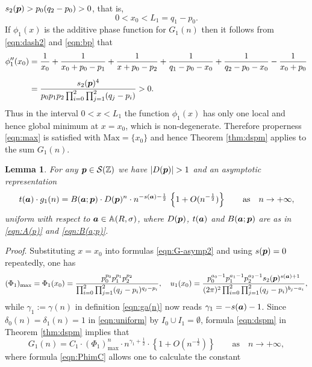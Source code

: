 \documentclass[a4paper,12pt]{article}
\theoremstyle{plain}
\newtheorem{lemma}[theorem]{Lemma}
\def\A{\mathbb{A}}
\def\Z{\mathbb{Z}}
\def\cS{\mathcal{S}}
\def\ba{\mbox{\boldmath $a$}}
\def\sba{\mbox{\boldmath ${\scriptstyle a}$}}
\def\bp{\mbox{\boldmath $p$}}
\def\Mm{\mathrm{M{\scriptstyle ax}}}
\begin{document}
$s_2(\bp) > p_0(q_2-p_0) > 0$, that is,  
\[ 
0 < x_0 < L_1 = q_1 - p_0. 
\]
If $\phi_1(x)$ is the additive phase function for $G_1(n)$ then 
it follows from \eqref{eqn:dash2} and \eqref{eqn:bp} that     
\begin{align*}
\phi_1''(x_0) &= 
\frac{1}{x_0} + \frac{1}{x_0+p_0-p_1} + \frac{1}{x+p_0-p_2} + 
\frac{1}{q_1-p_0-x_0} +  \frac{1}{q_2-p_0-x_0} - \frac{1}{x_0+p_0} \\[2mm]
&= \frac{s_2(\bp)^4}{p_0 p_1 p_2 \prod_{i=0}^2 \prod_{j=1}^2 (q_j-p_i)} > 0. 
\end{align*}
Thus in the interval $0 < x < L_1$ the function $\phi_1(x)$ has only one 
local and hence global minimum at $x = x_0$, which is non-degenerate.  
Therefore properness \eqref{eqn:max} is satisfied with $\Mm = \{x_0 \}$ 
and hence Theorem \ref{thm:dspm} applies to the sum $G_1(n)$. 
\begin{lemma} \label{lem:1st} 
For any $\bp \in \cS(\Z)$ we have $|D(\bp)| > 1$ and an 
asymptotic representation 
\[
t(\ba) \cdot g_1(n) = B(\ba; \bp)   
\cdot D(\bp)^{n} \cdot n^{-s(\sba) -\frac{1}{2} } 
\, \left\{ 1+ O(n^{-\frac{1}{2} }) \right\} \qquad \mbox{as} \quad 
n \to +\infty,     
\]
uniform with respect to $\ba \in \A(R, \sigma)$, where $D(\bp)$, $t(\ba)$ 
and $B(\ba; \bp)$ are as in \eqref{eqn:A(p)} and \eqref{eqn:B(a;p)}.    
\end{lemma}
{\it Proof}.   
Substituting $x = x_0$ into formulas \eqref{eqn:G-asymp2} and 
using $s(\bp) = 0$ repeatedly, one has  
\[
(\Phi_1)_{\mathrm{max}} = \Phi_1(x_0) 
= \dfrac{p_0^{p_0} p_1^{p_1} p_2^{p_2}}{\prod_{i=0}^2 \prod_{j=1}^2 
(q_j - p_i)^{q_j - p_i}},  \quad 
u_1(x_0) 
= \dfrac{p_0^{a_0-1} p_1^{a_1-1} p_2^{a_2-1} 
s_2(\bp)^{s(\sba) + 1}}{(2 \pi)^2 \prod_{i=0}^2 \prod_{j=1}^2 (q_j-p_i)^{b_j-a_i}}, 
\]
while $\gamma_1 := \gamma(n)$ in definition \eqref{eqn:ga(n)} now reads 
$\gamma_1 = - s(\ba) - 1$.  
Since $\delta_0(n) = \delta_1(n) = 1$ in \eqref{eqn:uniform} by 
$I_0 \cup I_1 = \emptyset$, formula \eqref{eqn:dspm} in 
Theorem \ref{thm:dspm} implies that  
\[
G_1(n) = C_1 \cdot (\Phi_1)_{\mathrm{max}}^n \cdot 
n^{\gamma_1 + \frac{1}{2} } \cdot \left\{ 1 + O(n^{- \frac{1}{2} }) \right\} 
\qquad \mbox{as} \quad n \to + \infty, 
\]
where formula \eqref{eqn:PhimC} allows one to calculate the constant 
\end{document}
